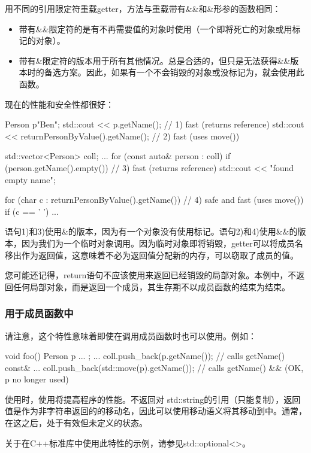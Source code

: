 用不同的引用限定符重载getter，方法与重载带有\&\&和\&形参的函数相同：

\begin{itemize}
	\item 带有\&\&限定符的是有不再需要值的对象时使用（一个即将死亡的对象或用标记的对象）。
	\item 带有\&限定符的版本用于所有其他情况。总是合适的，但只是无法获得\&\&版本时的备选方案。因此，如果有一个不会销毁的对象或没标记为，就会使用此函数。
\end{itemize}

现在的性能和安全性都很好：

\begin{cppcode}
Person p{"Ben"};
std::cout << p.getName(); // 1) fast (returns reference)
std::cout << returnPersonByValue().getName(); // 2) fast (uses move())

std::vector<Person> coll;
...
for (const auto& person : coll) {
	if (person.getName().empty()) { // 3) fast (returns reference)
		std::cout << "found empty name\n";
	}
}

for (char c : returnPersonByValue().getName()) { // 4) safe and fast (uses move())
	if (c == ' ') {
		...
	}
}
\end{cppcode}

语句1)和3)使用\&的版本，因为有一个对象没有使用标记。语句2)和4)使用\&\&的版本，因为我们为一个临时对象调用。因为临时对象即将销毁，getter可以将成员名移出作为返回值，这意味着不必为返回值分配新的内存，可以窃取了成员的值。

您可能还记得，return语句不应该使用来返回已经销毁的局部对象。本例中，不返回任何局部对象，而是返回一个成员，其生存期不以成员函数的结束为结束。

\subsubsection{用于成员函数中}

请注意，这个特性意味着即使在调用成员函数时也可以使用。例如：

\begin{cppcode}
void foo()
{
	Person p{ ... };
	...
	coll.push_back(p.getName()); // calls getName() const&
	...
	coll.push_back(std::move(p).getName()); // calls getName() && (OK, p no longer used)
}
\end{cppcode}

使用时，使用将提高程序的性能。不返回对 std::string的引用（只能复制），返回值是作为非字符串返回的的移动名，因此可以使用移动语义将其移动到中。通常，在这之后，处于有效但未定义的状态。

关于在C++标准库中使用此特性的示例，请参见std::optional<>。
















